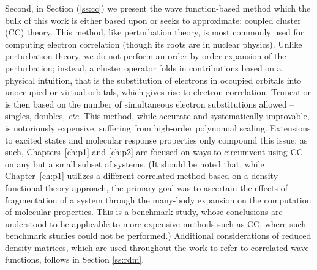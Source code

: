 Second, in Section (\ref{ss:cc}) we present the wave
function-based method which the bulk of this work is either
based upon or seeks to approximate: coupled cluster (CC) theory.
\cite{Sinanoglu1964,Cizek1966,Cizek1969,Crawford2000} This method,
like perturbation theory, is most commonly used for computing electron
correlation (though its roots are in nuclear physics).  Unlike perturbation
theory, we do not perform an order-by-order expansion of the perturbation;
instead, a cluster operator folds in contributions based on a physical
intuition, 
that is the substitution of electrons in occupied orbitals into
unoccupied or virtual orbitals,
which gives rise to electron correlation. 
Truncation is then based on the
number of simultaneous electron substitutions allowed -- singles, doubles, \textit{etc}.
This
method, while accurate and systematically improvable, is notoriously
expensive, suffering from high-order polynomial scaling. Extensions to
excited states and molecular response properties only compound this issue;
\cite{Hoodbhoy1979,Crawford2006,Helgaker2012,Crawford2019} as such, Chapters~\ref{ch:p1}
and \ref{ch:p2} are focused on ways to circumvent using CC on any but a small
subset of systems. (It should be noted that, while Chapter~\ref{ch:p1} utilizes a
different correlated method based on a density-functional theory approach,
the primary goal was to ascertain the effects of fragmentation of a system
through the many-body expansion on the computation of molecular properties.
This is a benchmark study, whose conclusions are understood to be applicable
to more expensive methods such as CC, where such benchmark studies could
not be performed.)  Additional considerations of reduced density matrices,
\cite{RDM1976,Harris1992,pinkbook} which are used throughout the work to
refer to correlated wave functions, follows in Section \ref{ss:rdm}.

